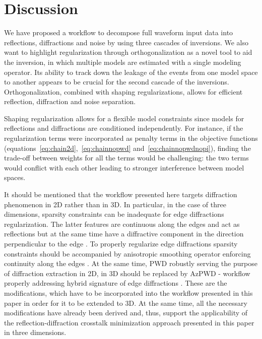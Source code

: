 
\section{Discussion}

We have proposed a workflow to decompose full waveform input data into reflections, diffractions and noise by using three cascades of inversions.
We also want to highlight regularization through orthogonalization as a novel tool to aid the inversion, in which multiple models are estimated with a single modeling operator. Its ability to track down the leakage of the events from one model space to another appears to be crucial for the second cascade of the inversions. Orthogonalization, combined with shaping regularizations, allows for efficient reflection, diffraction and noise separation.

Shaping regularization allows for a flexible
model constraints since models
for reflections and diffractions are conditioned independently.
For instance, if the regularization terms 
were incorporated as penalty terms in the objective functions (equations~\ref{eq:chain2d},~\ref{eq:chainnopwd} and~\ref{eq:chainnopwdnopi}),
finding the trade-off between weights for all the terms would be challenging:
the two terms would conflict with each other leading to stronger interference between model spaces. 

It should be mentioned that the workflow presented here targets diffraction phenomenon in 2D rather than in 3D. In particular, in the case of three dimensions, sparsity constraints can be inadequate for edge diffractions regularization. The latter features are continuous along the edges and act as reflections but at the same time have a diffractive component in the direction perpendicular to the edge \cite[]{moser2011edge}. To properly regularize edge diffractions sparsity constraints should be accompanied by anisotropic smoothing operator enforcing continuity along the edges \cite[]{merzlikin2018least}. At the same time, PWD robustly serving the purpose of diffraction extraction in 2D, in 3D should be replaced by AzPWD - workflow properly addressing hybrid signature of edge diffractions \cite[]{merzlikin2016diffraction,merzlikin2017diffraction}. These are the modifications, which have to be incorporated into the workflow presented in this paper in order for it to be extended to 3D. At the same time, all the necessary modifications have already been derived and, thus, support the applicability of the reflection-diffraction crosstalk minimization approach presented in this paper in three dimensions.

